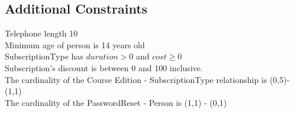 \subsection{Additional Constraints}
Telephone length 10\\
Minimum age of person is 14 years old\\
SubscriptionType has $duration > 0$ and $cost \ge 0$\\
Subscription's discount is between 0 and 100 inclusive.\\
The cardinality of the Course Edition - SubscriptionType relationship is (0,5)-(1,1)\\
The cardinality of the PasswordReset - Person is (1,1) - (0,1)